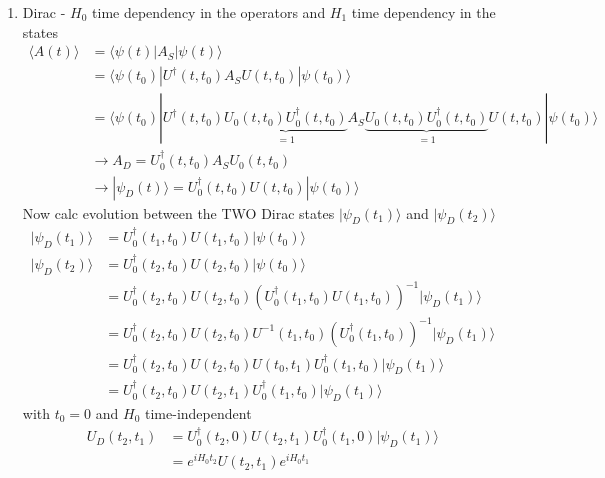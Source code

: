 \documentclass[10pt,a4paper]{book}
\theoremstyle{definition}
\begin{document}
\begin{enumerate}
\item Dirac - $H_0$ time dependency in the operators and $H_1$  time dependency in the states
\begin{align}
\langle A(t)\rangle
&=\langle\psi(t)|A_S|\psi(t)\rangle\\
&=\langle\psi(t_0)|U^\dagger(t,t_0)A_SU(t,t_0)|\psi(t_0)\rangle\\
&=\langle\psi(t_0)|U^\dagger(t,t_0)\underbrace{U_0(t,t_0)U_0^\dagger(t,t_0)}_{=1}A_S\underbrace{U_0(t,t_0)U_0^\dagger(t,t_0)}_{=1}U(t,t_0)|\psi(t_0)\rangle\\
&\rightarrow A_D=U_0^\dagger(t,t_0)A_SU_0(t,t_0)\\
&\rightarrow |\psi_D(t)\rangle= U_0^\dagger(t,t_0)U(t,t_0)|\psi(t_0)\rangle
\end{align}
Now calc evolution between the TWO Dirac states $|\psi_D(t_1)\rangle$ and $|\psi_D(t_2)\rangle$
\begin{align}
|\psi_D(t_1)\rangle&= U_0^\dagger(t_1,t_0)U(t_1,t_0)|\psi(t_0)\rangle\\
|\psi_D(t_2)\rangle&= U_0^\dagger(t_2,t_0)U(t_2,t_0)|\psi(t_0)\rangle\\
&= U_0^\dagger(t_2,t_0)U(t_2,t_0)\left(U_0^\dagger(t_1,t_0)U(t_1,t_0)\right)^{-1}|\psi_D(t_1)\rangle\\
&= U_0^\dagger(t_2,t_0)U(t_2,t_0)U^{-1}(t_1,t_0)\left(U_0^\dagger(t_1,t_0)\right)^{-1}|\psi_D(t_1)\rangle\\
&= U_0^\dagger(t_2,t_0)U(t_2,t_0)U(t_0,t_1)U_0^\dagger(t_1,t_0)|\psi_D(t_1)\rangle\\
&= U_0^\dagger(t_2,t_0)U(t_2,t_1)U_0^\dagger(t_1,t_0)|\psi_D(t_1)\rangle
\end{align}
with $t_0=0$ and $H_0$ time-independent
\begin{align}
U_D(t_2,t_1)
&= U_0^\dagger(t_2,0)U(t_2,t_1)U_0^\dagger(t_1,0)|\psi_D(t_1)\rangle\\
&= e^{iH_0t_2}U(t_2,t_1)e^{iH_0t_1}
\end{align}
\end{enumerate}
\end{document}

